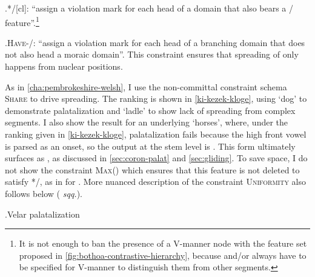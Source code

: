 \ex.*/[cl]: \enquote{assign a violation mark for each head of a  domain that also bears a / feature}.\footnote{It is not enough to ban the presence of a V-manner node with the feature set proposed in \cref{fig:bothoa-contrastive-hierarchy}, because \ipa{[i]} and/or \ipa{[y]} always have to be specified for V-manner to distinguish them from other  segments.}

\ex.\textsc{Have}-\mo/: \enquote{assign a violation mark for each head of a branching  domain that does not also head a moraic domain}. This constraint ensures that spreading of  only happens from nuclear positions.

As in \cref{cha:pembrokeshire-welsh}, I use the non-committal constraint schema \textsc{Share} to drive spreading. The ranking is shown in \ref{ki-kezek-kloge}, using \ipa{[ˈʧiː]} `dog' to demonstrate palatalization and \ipa{[ˈklɒːɡe]} `ladle' to show lack of spreading from complex segments. I also show the result for an underlying  `horses', where, under the ranking given in \cref{ki-kezek-kloge}, palatalization fails because the high front vowel is parsed as an onset, so the output at the stem level is \ipa{[kjɛzəɡ]}. This form ultimately surfaces as \ipa{[ˈʧɛzəɡ̊]}, as discussed in \cref{sec:coron-palat} and \cref{sec:gliding}.  To save space, I do not show the constraint \textsc{Max}() which ensures that this feature is not deleted to satisfy */, as in \ipa{[ˈklɒːdʒi]} for . More nuanced description of the constraint \textsc{Uniformity} also follows below ( \emph{sqq.}).

\ex.\label{ki-kezek-kloge}Velar palatalization\\


